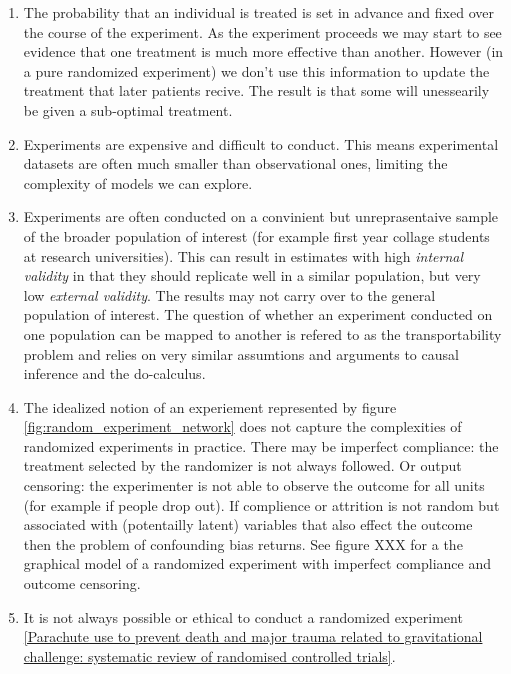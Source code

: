 \documentclass[11pt,a4paper,oneside]{book}
\begin{document}
\begin{enumerate}

\item The probability that an individual is treated is set in advance and fixed over the course of the experiment. As the experiment proceeds we may start to see evidence that one treatment is much more effective than another. However (in a pure randomized experiment) we don't use this information to update the treatment that later patients recive. The result is that some will unessearily be given a sub-optimal treatment. 
\item Experiments are expensive and difficult to conduct. This means experimental datasets are often much smaller than observational ones, limiting the complexity of models we can explore.

\item Experiments are often conducted on a convinient but unreprasentaive sample of the broader population of interest (for example first year collage students at research universities). This can result in estimates with high \emph{internal validity} \citep{Campbell1963} in that they should replicate well in a similar population, but very low \emph{external validity}. The results may not carry over to the general population of interest. The question of whether an experiment conducted on one population can be mapped to another is refered to as the transportability problem \citep{Bareinboim2013}  and relies on very similar assumtions and arguments to causal inference and the do-calculus. 

\item The idealized notion of an experiement represented by figure \ref{fig:random_experiment_network} does not capture the complexities of randomized experiments in practice. There may be imperfect compliance: the treatment selected by the randomizer is not always followed. Or output censoring: the experimenter is not able to observe the outcome for all units (for example if people drop out). If complience or attrition is not random but associated with (potentailly latent) variables that also effect the outcome then the problem of confounding bias returns. See figure XXX for a the graphical model of a randomized experiment with imperfect compliance and outcome censoring. 

\item It is not always possible or ethical to conduct a randomized experiment \cite{parashutes} \ref{Parachute use to prevent death and major trauma related to gravitational challenge: systematic review of randomised controlled trials}. 
\end{enumerate}
\end{document}

